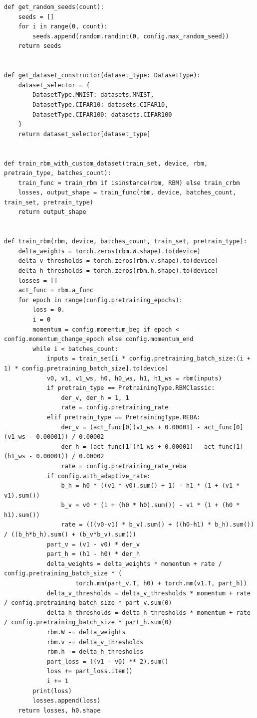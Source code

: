 \begin{lstlisting}[style=PythonStyle]
def get_random_seeds(count):
    seeds = []
    for i in range(0, count):
        seeds.append(random.randint(0, config.max_random_seed))
    return seeds


def get_dataset_constructor(dataset_type: DatasetType):
    dataset_selector = {
        DatasetType.MNIST: datasets.MNIST,
        DatasetType.CIFAR10: datasets.CIFAR10,
        DatasetType.CIFAR100: datasets.CIFAR100
    }
    return dataset_selector[dataset_type]


def train_rbm_with_custom_dataset(train_set, device, rbm, pretrain_type, batches_count):
    train_func = train_rbm if isinstance(rbm, RBM) else train_crbm
    losses, output_shape = train_func(rbm, device, batches_count, train_set, pretrain_type)
    return output_shape


def train_rbm(rbm, device, batches_count, train_set, pretrain_type):
    delta_weights = torch.zeros(rbm.W.shape).to(device)
    delta_v_thresholds = torch.zeros(rbm.v.shape).to(device)
    delta_h_thresholds = torch.zeros(rbm.h.shape).to(device)
    losses = []
    act_func = rbm.a_func
    for epoch in range(config.pretraining_epochs):
        loss = 0.
        i = 0
        momentum = config.momentum_beg if epoch < config.momentum_change_epoch else config.momentum_end
        while i < batches_count:
            inputs = train_set[i * config.pretraining_batch_size:(i + 1) * config.pretraining_batch_size].to(device)
            v0, v1, v1_ws, h0, h0_ws, h1, h1_ws = rbm(inputs)
            if pretrain_type == PretrainingType.RBMClassic:
                der_v, der_h = 1, 1
                rate = config.pretraining_rate
            elif pretrain_type == PretrainingType.REBA:
                der_v = (act_func[0](v1_ws + 0.00001) - act_func[0](v1_ws - 0.00001)) / 0.00002
                der_h = (act_func[1](h1_ws + 0.00001) - act_func[1](h1_ws - 0.00001)) / 0.00002
                rate = config.pretraining_rate_reba
            if config.with_adaptive_rate:
                b_h = h0 * ((v1 * v0).sum() + 1) - h1 * (1 + (v1 * v1).sum())
                b_v = v0 * (1 + (h0 * h0).sum()) - v1 * (1 + (h0 * h1).sum())
                rate = (((v0-v1) * b_v).sum() + ((h0-h1) * b_h).sum()) / ((b_h*b_h).sum() + (b_v*b_v).sum())
            part_v = (v1 - v0) * der_v
            part_h = (h1 - h0) * der_h
            delta_weights = delta_weights * momentum + rate / config.pretraining_batch_size * (
                    torch.mm(part_v.T, h0) + torch.mm(v1.T, part_h))
            delta_v_thresholds = delta_v_thresholds * momentum + rate / config.pretraining_batch_size * part_v.sum(0)
            delta_h_thresholds = delta_h_thresholds * momentum + rate / config.pretraining_batch_size * part_h.sum(0)
            rbm.W -= delta_weights
            rbm.v -= delta_v_thresholds
            rbm.h -= delta_h_thresholds
            part_loss = ((v1 - v0) ** 2).sum()
            loss += part_loss.item()
            i += 1
        print(loss)
        losses.append(loss)
    return losses, h0.shape



\end{lstlisting}
